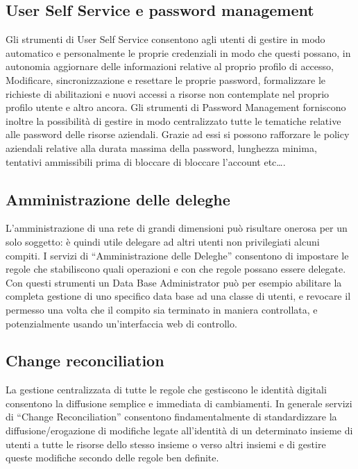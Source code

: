 \subsection{User Self Service e password management}
Gli strumenti di User Self Service consentono agli utenti di gestire in modo
automatico e personalmente le proprie credenziali in modo che questi possano, in
autonomia aggiornare delle informazioni relative al proprio profilo di accesso, 
Modificare, sincronizzazione e resettare le proprie password, formalizzare le
richieste di abilitazioni e nuovi accessi a risorse non contemplate nel proprio
profilo utente e altro ancora.
Gli strumenti di Password Management forniscono inoltre la possibilità di gestire in
modo centralizzato tutte le tematiche relative alle password delle risorse
aziendali. Grazie ad essi si possono rafforzare le policy aziendali relative
alla durata massima della password, lunghezza minima, tentativi ammissibili
prima di bloccare di bloccare l'account etc\ldots.

\subsection{Amministrazione delle deleghe}
L'amministrazione di una rete di grandi dimensioni può risultare onerosa
per un solo soggetto: è quindi utile delegare ad altri utenti non privilegiati
alcuni compiti. I servizi di “Amministrazione delle Deleghe” consentono di
impostare le regole che stabiliscono quali operazioni e con che regole possano
essere delegate. 
Con questi strumenti un Data Base Administrator può per esempio abilitare la
completa gestione di uno specifico data base ad una classe di utenti, e revocare
il permesso una volta che il compito sia terminato in maniera controllata, e
potenzialmente usando un'interfaccia web di controllo.

\subsection{Change reconciliation}
La gestione centralizzata di tutte le regole che gestiscono le identità digitali
consentono la diffusione semplice e immediata di cambiamenti.
In generale servizi di “Change Reconciliation” consentono findamentalmente di
standardizzare la diffusione/erogazione di modifiche legate all’identità di un
determinato insieme di utenti a tutte le risorse dello stesso insieme o verso
altri insiemi e di gestire queste modifiche secondo delle regole ben definite.

